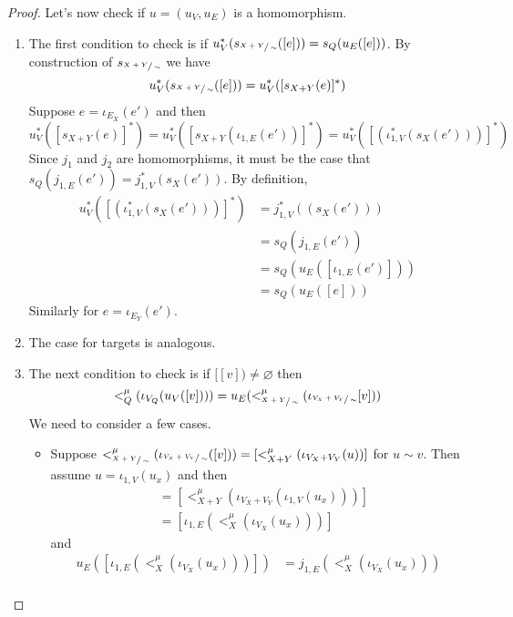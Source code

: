 \begin{proof}
    Let's now check if $u = (u_{V},u_{E})$ is a homomorphism.
    \begin{enumerate}
        \item The first condition to check is if $u_{V}^{*}(s_{\sfrac{X+Y}{\sim}}([e])) = s_{Q}(u_{E}([e]))$. 
              By construction of $s_{\sfrac{X+Y}{\sim}}$ we have
              \[
                u_{V}^{*}(s_{\sfrac{X+Y}{\sim}}([e])) = u_{V}^{*}([s_{X+Y}(e)]^{*})
              \]
              Suppose $e = \iota_{E_{X}}(e')$ and then
              \[
                u_{V}^{*}([s_{X+Y}(e)]^{*}) = u_{V}^{*}([s_{X+Y}(\iota_{1,E}(e'))]^{*}) = u_{V}^{*}([(\iota_{1,V}^{*}(s_{X}(e')))]^{*})
              \]
              Since $j_1$ and $j_2$ are homomorphisms, it must be the case that $s_{Q}(j_{1,E}(e')) = j_{1,V}^{*}(s_{X}(e'))$.
              By definition, 
              \begin{align*}                
                u_{V}^{*}([(\iota_{1,V}^{*}(s_{X}(e')))]^{*}) &= j_{1,V}^{*}((s_{X}(e')))\\ 
                &= s_{Q}(j_{1,E}(e'))\\
                &= s_{Q}(u_{E}([\iota_{1,E}(e')]))\\
                &= s_{Q}(u_{E}([e]))
            \end{align*}
            Similarly for $e = \iota_{E_{Y}}(e')$.
        \item The case for targets is analogous.
        \item The next condition to check is if $[[v]) \not = \varnothing$ then 
    \[
        <^{\mu}_{Q}(\iota_{V_{Q}}(u_{V}([v]))) = u_{E}(<^{\mu}_{\sfrac{X+Y}{\sim}}(\iota_{\sfrac{V_{X} + V_{Y}}{\sim}}[v]))
    \]
    We need to consider a few cases.
    \begin{itemize}
        \item Suppose $<_{\sfrac{X+Y}{\sim}}^{\mu}(\iota_{\sfrac{V_{X} + V_{Y}}{\sim}}([v])) = [<_{X+Y}^{\mu}(\iota_{V_{X} + V_{Y}}(u))]$ for $u \sim v$.
              Then assume $u = \iota_{1,V}(u_{x})$ and then 
              \begin{align*}
                [<_{X+Y}^{\mu}(\iota_{V_{X} + V_{Y}}(u))] &= [<_{X+Y}^{\mu}(\iota_{V_{X} + V_{Y}}(\iota_{1,V}(u_{x})))]\\
                &= [\iota_{1,E}(<_{X}^{\mu}(\iota_{V_{X}}(u_{x})))]
            \end{align*}
            and
            \begin{align*}
                u_{E}([\iota_{1,E}(<_{X}^{\mu}(\iota_{V_{X}}(u_{x})))]) &= j_{1,E}(<_{X}^{\mu}(\iota_{V_{X}}(u_{x})))\\

\end{align*}
\end{itemize}
\end{enumerate}
\end{proof}
